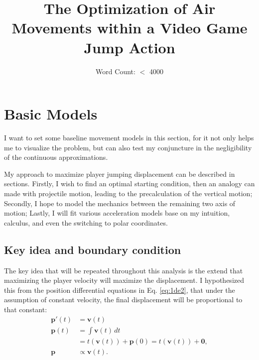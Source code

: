 \documentclass[a4paper,12pt]{article}
\title{The Optimization of Air Movements within a Video Game Jump Action}
\author{Word Count: $<$ 4000}
\date{}
\newcommand{\tvec}[1]{\boldsymbol{#1}}
\newcommand{\tv}{\tvec{v}}
\newcommand{\tp}{\tvec{p}}
\begin{document}
    \maketitle

    \newpage

    \newpage

    \tableofcontents

    \newpage













\section{Basic Models}
I want to set some baseline movement models in this section, for it not only helps me to visualize the problem, but can also test my conjuncture in the negligibility of the continuous approximations.

My approach to maximize player jumping displacement can be described in sections. Firstly, I wish to find an optimal starting condition, then an analogy can made with projectile motion, leading to the precalculation of the vertical motion; Secondly, I hope to model the mechanics between the remaining two axis of motion; Lastly, I will fit various acceleration models base on my intuition, calculus, and even the switching to polar coordinates.

\subsection{Key idea and boundary condition}
The key idea that will be repeated throughout this analysis is the extend that maximizing the player velocity will maximize the displacement. I hypothesized this from the position differential equations in Eq. \ref{eq:1de2}, that under the assumption of constant velocity, the final displacement will be proportional to that constant:
\begin{align*}
    \tp'(t) &= \tv(t)\\
    \tp(t) &= \int \tv(t) \, dt\\
    &= t(\tv(t)) + \tp(0) = t(\tv(t)) + \tvec{0},\\
    \tp &\propto \tv(t).
\end{align*}
\end{document}
